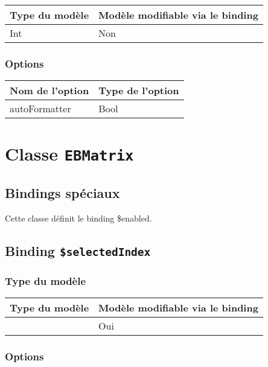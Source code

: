 \begin{tabular}{|l|l|}
\hline
\textbf{Type du modèle} & \textbf{Modèle modifiable via le binding}\\
\hline
Int & Non\\
\hline
\end{tabular}
\subsubsection{Options}

\begin{tabular}{|l|l|}
\hline
\textbf{Nom de l'option} & \textbf{Type de l'option}\\
\hline
autoFormatter & Bool\\
\hline
\end{tabular}







\section{Classe \texttt{EBMatrix}}

\subsection{Bindings spéciaux}

Cette classe définit le binding \$enabled.

\subsection{Binding \texttt{\$selectedIndex}}

\subsubsection{Type du modèle}

\begin{tabular}{|l|l|}
\hline
\textbf{Type du modèle} & \textbf{Modèle modifiable via le binding}\\
\hline
 & Oui\\
\hline
\end{tabular}
\subsubsection{Options}

